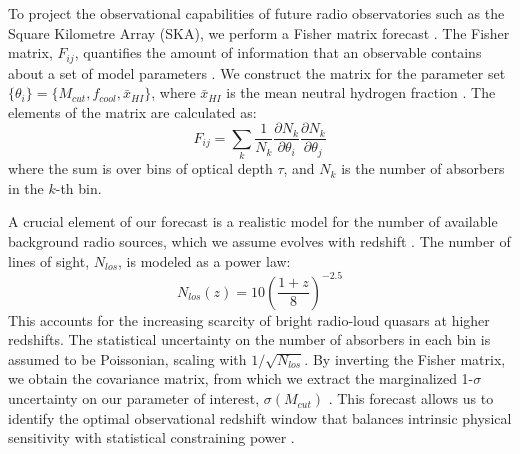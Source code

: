 \documentclass[]{article}
\begin{document}
To project the observational capabilities of future radio observatories such as the Square Kilometre Array (SKA), we perform a Fisher matrix forecast \citep{Ewall_Wice_2016,Berti_2023,Balu_2023,Mason_2023}. The Fisher matrix, $F_{ij}$, quantifies the amount of information that an observable contains about a set of model parameters \citep{Mason_2023,Balu_2023,Ewall_Wice_2016,Alves_2017,sarkar2017fishermatrixbasedpredictions}. We construct the matrix for the parameter set $\{\theta_i\} = \{M_{cut}, f_{cool}, \bar{x}_{HI}\}$, where $\bar{x}_{HI}$ is the mean neutral hydrogen fraction \citep{Balu_2023,Mason_2023,Ewall_Wice_2016,zhang2025constrainingneutralhydrogenfraction}. The elements of the matrix are calculated as:
\begin{equation}
F_{ij} = \sum_{k} \frac{1}{N_k} \frac{\partial N_k}{\partial \theta_i} \frac{\partial N_k}{\partial \theta_j}
\end{equation}
where the sum is over bins of optical depth $\tau$, and $N_k$ is the number of absorbers in the $k$-th bin.\citep{Mallik_2024,2021}

A crucial element of our forecast is a realistic model for the number of available background radio sources, which we assume evolves with redshift \citep{Haiman_2004,massardi2010modelcosmologicalevolutionlow,Smol_i__2017,gao2024empiricalmodelextragalacticradio}. The number of lines of sight, $N_{los}$, is modeled as a power law:
\begin{equation}
N_{los}(z) = 10 \left( \frac{1+z}{8} \right)^{-2.5}
\end{equation}
This accounts for the increasing scarcity of bright radio-loud quasars at higher redshifts. The statistical uncertainty on the number of absorbers in each bin is assumed to be Poissonian, scaling with $1/\sqrt{N_{los}}$. By inverting the Fisher matrix, we obtain the covariance matrix, from which we extract the marginalized 1-$\sigma$ uncertainty on our parameter of interest, $\sigma(M_{cut})$ \citep{Porter_2015}. This forecast allows us to identify the optimal observational redshift window that balances intrinsic physical sensitivity with statistical constraining power \citep{wolfson2023forecastingconstraintshighzigm}.
\end{document}
